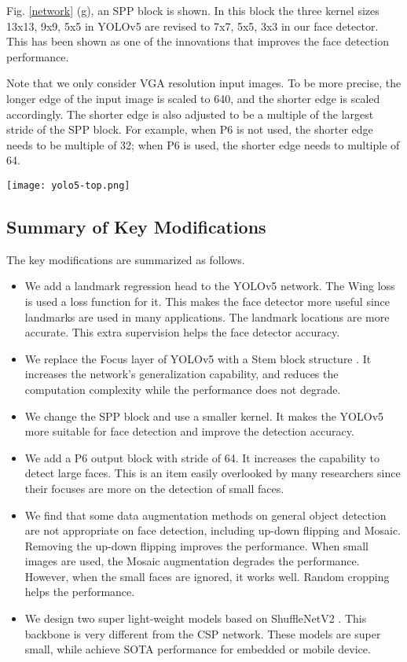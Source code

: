 \documentclass[conference]{IEEEtran}
\begin{document}
Fig. \ref{network} (g), an SPP block \cite{SPP} is shown. In this block the three kernel sizes 13x13, 9x9, 5x5 in YOLOv5 are revised to 7x7, 5x5, 3x3 in our face detector.  This has been shown as one of the innovations that improves the face detection performance. 

Note that we only consider VGA resolution input images. To be more precise, the longer edge of the input image is scaled to 640, and the shorter edge is scaled accordingly. The shorter edge is also adjusted to be a multiple of the largest stride of the SPP block. For example, when P6 is not used, the shorter edge needs to be multiple of 32; when P6 is used, the shorter edge needs to multiple of 64.   

\begin{figure*}
    \centering
    \texttt{[image: yolo5-top.png]}
    \caption{The proposed YOLO5Face network architecture.}
    \label{network}
\end{figure*}


\subsection{Summary of Key Modifications}

The key modifications are summarized as follows.  

\begin{itemize}
\item {We add a landmark regression head to the YOLOv5 network. The Wing loss \cite{wingloss} is used a loss function for it. This makes the face detector more useful since landmarks are used in many applications. The landmark locations are more accurate. This extra supervision helps the face detector accuracy.}
\item {We replace the Focus layer of YOLOv5 \cite{YOLOv5} with a Stem block structure \cite{Stem}. It increases the network's generalization capability, and reduces the computation complexity while the performance does not degrade.} 
\item {We change the SPP block \cite{SPP} and use a smaller kernel. It makes the YOLOv5 more suitable for face detection and improve the detection accuracy.} 
\item {We add a P6 output block with stride of 64. It increases the capability to detect large faces. This is an item easily overlooked by many researchers since their focuses are more on the detection of small faces.}
\item {We find that some data augmentation methods on general object detection are not appropriate on face detection, including up-down flipping and Mosaic. Removing the up-down flipping improves the performance. When small images are used, the Mosaic augmentation \cite{YOLOv4} degrades the performance. However, when the small faces are ignored, it works well. Random cropping helps the performance.}
\item {We design two super light-weight models based on ShuffleNetV2 \cite{ShuffleNetv2}. This backbone is very different from the CSP network. These models are super small, while achieve SOTA performance for embedded or mobile device.}
\end{itemize}
\end{document}
